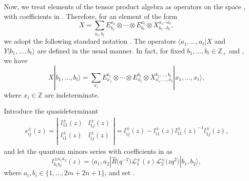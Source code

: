 \documentclass[pdftex]{sigma}
\numberwithin{equation}{section}
\begin{document}
 Now, we treat elements of the tensor product algebra
 as operators on the space , with coefficients in .
Therefore, for an element of the form
\begin{equation*}
 X = \sum\limits_{a_i,b_i} E^{a_1}_{b_1} \otimes \cdots \otimes E^{a_t}_{b_t} \otimes X^{a_1 \cdots a_t}_{b_1 \cdots b_t},
\end{equation*}
we adopt the following standard notation
.
The operators $\langle a_1, \ldots, a_t | X$ and $Y | b_1, \ldots, b_t \rangle$ are defined in the usual manner.
In fact, for fixed $b_1, \ldots, b_t \in \mathbb{Z}_+$ and , we have
\begin{equation*}
 X | b_1, \ldots, b_t \rangle = \sum\limits_{x_i} E_{x_1}^{b_1} \otimes \cdots \otimes E_{x_t}^{b_t} \otimes X_{x_1, \ldots, x_t}^{b_1, \ldots, b_t} | x_1, \ldots, x_t \rangle,
\end{equation*}
where $x_i \in \mathbb{Z}$ are indeterminate.



Introduce the quasideterminant
\begin{align*}s^{\pm}_{ij}(z)=
 \left|
 \begin{matrix}
 l_{11}^{\pm}(z) & l_{1j}^{\pm}(z) \\
 l_{i1}^{\pm}(z) & \boxed{l_{ij}^{\pm}(z)} \\
 \end{matrix}
 \right|= l_{ij}^{\pm}(z)- l_{i1}^{\pm}(z) l_{11}^{\pm}(z)^{-1} l_{1j}^{\pm}(z),
\end{align*}and let the quantum minors series  with coefficients in  as
\[%
 l^{\pm a_1a_2}_{b_1b_2}(z)=\big\langle a_1, a_2|\widehat{R}\bigl(q^{-2}\bigr)\mathcal{L}_1^{\pm}(z)\mathcal{L}_2^{\pm}\bigl(zq^{2}\bigr)|b_1, b_2\big\rangle,
\]
where $a_i, b_i\in\{1,\dots,2m+2n+1\}$, and set
.
\end{document}
